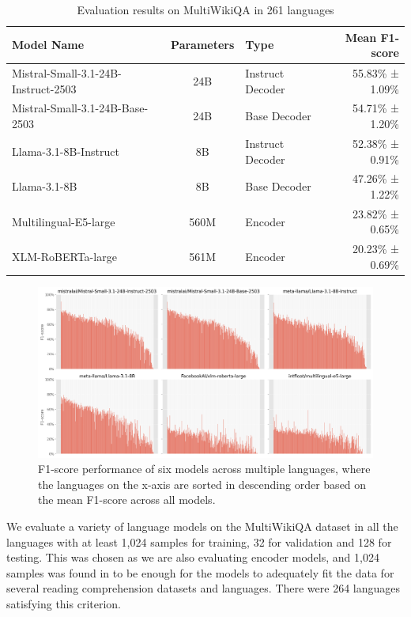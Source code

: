 \documentclass[10pt, a4paper]{article}
\begin{document}
\begin{table}[h]
    \centering
    \small
    \begin{tabular}{lclr}
        \textbf{Model Name} & \textbf{Parameters} & \textbf{Type} & \textbf{Mean F1-score} \\
        \midrule
        Mistral-Small-3.1-24B-Instruct-2503 \cite{mistralsmall2025} & 24B & Instruct Decoder & 55.83\% ± 1.09\% \\
        Mistral-Small-3.1-24B-Base-2503 \cite{mistralsmall2025} & 24B & Base Decoder & 54.71\% ± 1.20\% \\
        Llama-3.1-8B-Instruct \cite{grattafiori2024llama} & 8B & Instruct Decoder & 52.38\% ± 0.91\% \\
        Llama-3.1-8B \cite{grattafiori2024llama} & 8B & Base Decoder & 47.26\% ± 1.22\% \\
        Multilingual-E5-large \cite{wang2024multilingual} & 560M & Encoder & 23.82\% ± 0.65\% \\
        XLM-RoBERTa-large \cite{ruder2019unsupervised} & 561M & Encoder & 20.23\% ± 0.69\% \\
    \end{tabular}
    \caption{Evaluation results on MultiWikiQA in 261 languages}
    \label{tab:evaluated-models}
\end{table}

\begin{figure}[h]
    \centering
    \includegraphics[width=\textwidth]{evaluation-plot.png}
    \caption{F1-score performance of six models across multiple languages, where the
    languages on the x-axis are sorted in descending order based on the mean F1-score
  across all models.}
    \label{fig:evaluation-results}
\end{figure}

We evaluate a variety of language models on the MultiWikiQA dataset in all the languages
with at least 1,024 samples for training, 32 for validation and 128 for testing. This
was chosen as we are also evaluating encoder models, and 1,024 samples was found in
\citet{nielsen-2023-scandeval} to be enough for the models to adequately fit the data
for several reading comprehension datasets and languages. There were 264 languages
satisfying this criterion.
\end{document}

